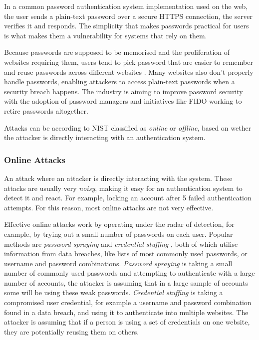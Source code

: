In a common password authentication system implementation used on the web, the user sends a plain-text password over a secure HTTPS connection, the server verifies it and responds.
The simplicity that makes passwords practical for users is what makes them a vulnerability for systems that rely on them.

Because passwords are supposed to be memorised and the proliferation of websites requiring them, users tend to pick password that are easier to remember and reuse passwords across different websites \cite{conklin2004password}.
Many websites also don't properly handle passwords, enabling attackers to access plain-text passwords when a security breach happens.
The industry is aiming to improve password security with the adoption of password managers and initiatives like FIDO \cite{balfanz2013fido} working to retire passwords altogether.

Attacks can be according to NIST \cite{grassi2017} classified as \textit{online} or \textit{offline}, based on wether the attacker is directly interacting with an authentication system.


\subsubsection{Online Attacks} An attack where an attacker is directly interacting with the system.
These attacks are usually very \textit{noisy}, making it easy for an authentication system to detect it and react.
For example, locking an account after 5 failed authentication attempts.
For this reason, most online attacks are not very effective.

Effective online attacks work by operating under the radar of detection, for example, by trying out a small number of passwords on each user.
Popular methods are \textit{password spraying} and \textit{credential stuffing} \cite{haber2020attack}, both of which utilise information from data breaches, like lists of most commonly used passwords, or username and password combinations.
\textit{Password spraying} is taking a small number of commonly used passwords and attempting to authenticate with a large number of accounts, the attacker is assuming that in a large sample of accounts some will be using these weak passwords.
\textit{Credential stuffing} is taking a compromised user credential, for example a username and password combination found in a data breach, and using it to authenticate into multiple websites.
The attacker is assuming that if a person is using a set of credentials on one website, they are potentially reusing them on others.

